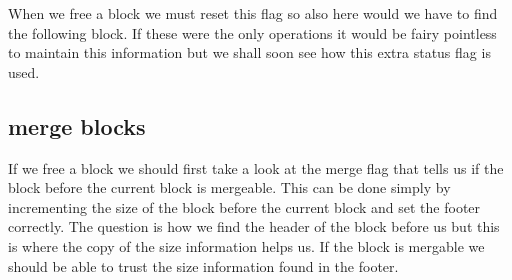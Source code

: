 \documentclass[a4paper,11pt]{article}
\begin{document}
 When we free a block we must reset this flag so also here would we
 have to find the following block. If these were the only operations
 it would be fairy pointless to maintain this information but we shall
 soon see how this extra status flag is used. 

 \subsection{merge blocks}

 
 If we free a block we should first take a look at the merge flag that
 tells us if the block before the current block is mergeable.  This
 can be done simply by incrementing the size of the block before the
 current block and set the footer correctly. The question is how we
 find the header of the block before us but this is where the copy of
 the size information helps us. If the block is mergable we should be
 able to trust the size information found in the footer.
 
\end{document}
